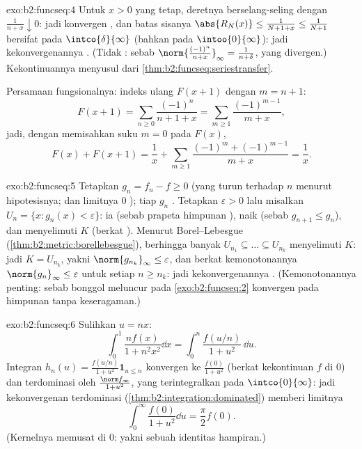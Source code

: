 \begin{solution}{exo:b2:funcseq:4}
Untuk $x > 0$ yang tetap, deretnya berselang-seling dengan $\frac{1}{n +
x} \downarrow 0$: jadi konvergen , dan batas sisanya
$\abs{R_N(x)} \leq \frac{1}{N + 1 + x} \leq \frac{1}{N+1}$ bersifat
\emph{} pada $\intco{\delta}{\infty}$ (bahkan pada
$\intoo{0}{\infty}$): jadi kekonvergenannya . (Tidak :
sebab $\norm{\frac{(-1)^n}{n+x}}_\infty = \frac{1}{n + \delta}$, yang
divergen.) Kekontinuannya menyusul dari
\cref{thm:b2:funcseq:seriestransfer}.

Persamaan fungsionalnya: indeks ulang $F(x + 1)$ dengan $m = n + 1$:
\[
F(x+1) = \sum_{n\geq0} \frac{(-1)^n}{n + 1 + x}
= \sum_{m\geq1}\frac{(-1)^{m-1}}{m+x} ,
\]
jadi, dengan memisahkan suku $m = 0$ pada $F(x)$,
\[
F(x) + F(x+1)
= \frac{1}{x} + \sum_{m\geq1}
\frac{(-1)^m + (-1)^{m-1}}{m+x} = \frac1x .
\]
\end{solution}

\begin{solution}{exo:b2:funcseq:5}
Tetapkan $g_n = f_n - f \geq 0$ (yang turun terhadap $n$ menurut
hipotesisnya; dan limitnya $0$ ); tiap $g_n$ .
Tetapkan $\varepsilon > 0$ lalu misalkan $U_n = \{x : g_n(x) <
\varepsilon\}$: ia  (sebab prapeta himpunan ), naik (sebab
$g_{n+1} \leq g_n$), dan menyelimuti $K$ (berkat ). Menurut Borel--Lebesgue
(\cref{thm:b2:metric:borellebesgue}), berhingga banyak $U_{n_1}
\subseteq \dots \subseteq U_{n_k}$ menyelimuti $K$: jadi $K = U_{n_k}$,
yakni $\norm{g_{n_k}}_\infty \leq \varepsilon$, dan berkat kemonotonannya
$\norm{g_n}_\infty \leq \varepsilon$ untuk setiap $n \geq n_k$: jadi
kekonvergenannya . (Kemonotonannya penting: sebab bonggol
meluncur pada \cref{exo:b2:funcseq:2} konvergen  pada
himpunan  tanpa keseragaman.)
\end{solution}

\begin{solution}{exo:b2:funcseq:6}
Sulihkan $u = nx$:
\[
\int_0^1 \frac{n f(x)}{1 + n^2x^2}\dd x
= \int_0^n \frac{f(u/n)}{1 + u^2}\,\dd u .
\]
Integran $h_n(u) = \frac{f(u/n)}{1+u^2}\mathbf{1}_{u \leq n}$
konvergen  ke $\frac{f(0)}{1+u^2}$ (berkat kekontinuan
$f$ di $0$) dan terdominasi oleh $\frac{\norm f_\infty}{1 + u^2}$, yang
terintegralkan pada $\intco{0}{\infty}$: jadi kekonvergenan terdominasi
(\cref{thm:b2:integration:dominated}) memberi limitnya
\[
\int_0^\infty \frac{f(0)}{1 + u^2}\dd u = \frac{\pi}{2} f(0) .
\]
(Kernelnya memusat di $0$: yakni sebuah identitas hampiran.)
\end{solution}

